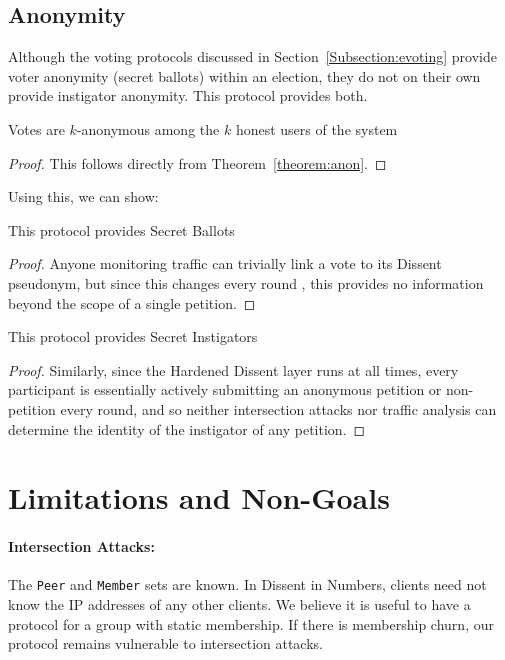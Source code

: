 \subsection{Anonymity}
Although the voting protocols discussed in Section~\ref{Subsection:evoting}
provide voter anonymity (secret ballots) within an election, they do not on
their own provide instigator anonymity. This protocol provides both.

\begin{lemma} Votes are $k$-anonymous among the $k$ honest users of the system
\end{lemma}
\begin{proof} This follows directly from Theorem~\ref{theorem:anon}.\end{proof}

Using this, we can show:

\begin{theorem} This protocol provides Secret Ballots \end{theorem}
\begin{proof} Anyone monitoring traffic can trivially link a vote to its Dissent
  pseudonym, but since this changes every round \cite{sec}, this provides no
  information beyond the scope of a single petition.
\end{proof}

\begin{theorem} This protocol provides Secret Instigators \end{theorem}
\begin{proof} Similarly, since the Hardened Dissent layer runs at all times,
  every participant is essentially actively submitting an anonymous petition or
  non-petition every round, and so neither intersection attacks nor traffic
  analysis can determine the identity of the instigator of any petition.
\end{proof}

\section{Limitations and Non-Goals}
  \paragraph{Intersection Attacks:} The \texttt{Peer} and \texttt{Member} sets
  are known. In Dissent in Numbers, clients need not know the IP addresses of
  any other clients. We believe it is useful to have a protocol for a group with
  static membership.  If there is membership churn, our protocol remains
  vulnerable to intersection attacks.
